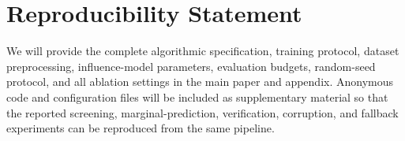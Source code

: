 \section*{Reproducibility Statement}
We will provide the complete algorithmic specification, training protocol, dataset preprocessing, influence-model parameters, evaluation budgets, random-seed protocol, and all ablation settings in the main paper and appendix. Anonymous code and configuration files will be included as supplementary material so that the reported screening, marginal-prediction, verification, corruption, and fallback experiments can be reproduced from the same pipeline.
